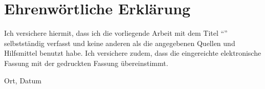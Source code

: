 \clearpage
\chapter*{Ehrenwörtliche Erklärung}


Ich versichere hiermit, dass ich die vorliegende Arbeit mit dem Titel ``\textit{\DerTitelDerArbeit}'' selbstständig verfasst und 
keine anderen als die angegebenen Quellen und Hilfsmittel benutzt habe. Ich versichere zudem, dass die eingereichte elektronische 
Fassung mit der gedruckten Fassung übereinstimmt.

\vspace{3cm}
Ort, Datum \hfill \DerAutorDerArbeit

